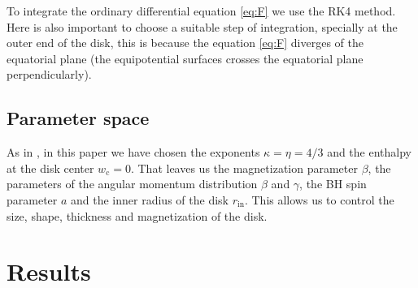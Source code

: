 \documentclass{aa}
\begin{document}
To integrate the ordinary differential equation \eqref{eq:F} we use the RK4 method. Here is also important to choose a suitable step of integration, specially at the outer end of the disk, this is because the equation \eqref{eq:F} diverges of the equatorial plane (the equipotential surfaces crosses the equatorial plane perpendicularly). 

\subsection{Parameter space}

As in \citet{Komissarov:2006}, in this paper we have chosen the exponents $\kappa = \eta = 4/3$ and the enthalpy at the disk center $w_{\mathrm{c}} = 0$. That leaves us the magnetization parameter $\beta$, the parameters of the angular momentum distribution $\beta$ and $\gamma$, the BH spin parameter $a$ and the inner radius of the disk $r_{\mathrm{in}}$. This allows us to control the size, shape, thickness and magnetization of the disk.

\section{Results}
\end{document}
